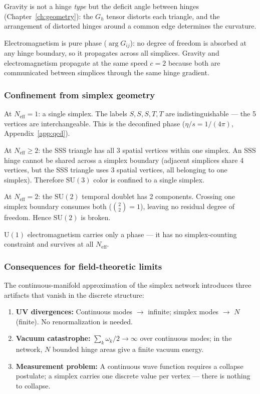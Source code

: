 \documentclass[12pt]{article}
\theoremstyle{remark}
\theoremstyle{definition}
\begin{document}
Gravity is not a hinge \emph{type} but the deficit angle between hinges (Chapter~\ref{ch:geometry}): the $G_h$ tensor distorts each triangle, and the arrangement of distorted hinges around a common edge determines the curvature.

Electromagnetism is pure phase ($\arg G_{ij}$): no degree of freedom is absorbed at any hinge boundary, so it propagates across all simplices. Gravity and electromagnetism propagate at the same speed $c = 2$ because both are communicated between simplices through the same hinge gradient.

\subsubsection{Confinement from simplex geometry}

At $N_\text{eff} = 1$: a single simplex. The labels $S, S, S, T, T$ are indistinguishable --- the 5 vertices are interchangeable. This is the deconfined phase ($\eta/s = 1/(4\pi)$, Appendix~\ref{app:qcd}).

At $N_\text{eff} \geq 2$: the SSS triangle has all 3 spatial vertices within one simplex. An SSS hinge cannot be shared across a simplex boundary (adjacent simplices share 4 vertices, but the SSS triangle uses 3 spatial vertices, all belonging to one simplex). Therefore $\text{SU}(3)$ color is confined to a single simplex.

At $N_\text{eff} = 2$: the $\text{SU}(2)$ temporal doublet has 2 components. Crossing one simplex boundary consumes both ($\binom{2}{2} = 1$), leaving no residual degree of freedom. Hence $\text{SU}(2)$ is broken.

$\text{U}(1)$ electromagnetism carries only a phase --- it has no simplex-counting constraint and survives at all $N_\text{eff}$.

\subsubsection{Consequences for field-theoretic limits}

The continuous-manifold approximation of the simplex network introduces three artifacts that vanish in the discrete structure:

\begin{enumerate}
\item \textbf{UV divergences:} Continuous modes $\to$ infinite; simplex modes $\to$ $N$ (finite). No renormalization is needed.
\item \textbf{Vacuum catastrophe:} $\sum_k \omega_k/2 \to \infty$ over continuous modes; in the network, $N$ bounded hinge areas give a finite vacuum energy.
\item \textbf{Measurement problem:} A continuous wave function requires a collapse postulate; a simplex carries one discrete value per vertex --- there is nothing to collapse.
\end{enumerate}
\end{document}
